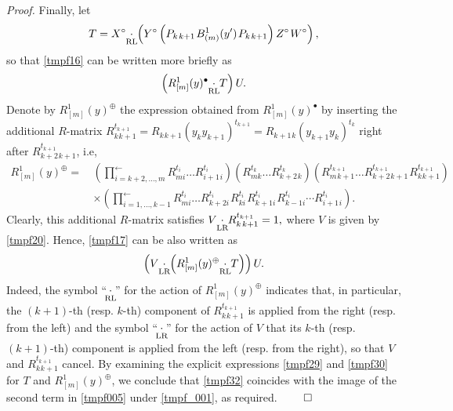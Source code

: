 \documentclass[12pt,a4paper,reqno]{amsart}
\theoremstyle{stil}
\theoremstyle{defi}
\theoremstyle{defi}
\theoremstyle{stil}
\theoremstyle{stil}
\theoremstyle{stil}
\theoremstyle{prim}
\newenvironment{prf}{\noindent \textit{Proof.}}{\null\hfill$\qed$\hskip
2mm\vskip 2mm}
\newcommand{\non}{\nonumber}
\newcommand{\beq}{\begin{equation}}
\newcommand{\eeq}{\end{equation}}
\newcommand{\ts}{\hspace{1pt}}
\newcommand{\cdotrl}{\mathop{\hspace{-2pt}\underset{\text{RL}}{\cdot}\hspace{-2pt}}}
\newcommand{\cdotlr}{\mathop{\hspace{-2pt}\underset{\text{LR}}{\cdot}\hspace{-2pt}}}
\begin{document}
\begin{prf}
Finally, let
\beq\label{tmpf29}
T=
X^\circ \cdotrl\left(
 Y^\circ   \left(P_{k\ts k+1}\ts
B_{(m)}^1(y^\prime)\ts
P_{k\ts k+1}\right)    Z^\circ  \ts W^\circ\right),
\eeq
so that \eqref{tmpf16} can be written more briefly as 
\beq\label{tmpf17}
	\left(R_{[m]}^1 (y)^\bullet \cdotrl 
T\right) U.
\eeq
Denote by $R_{[m]}^1 (y)^\oplus $ the expression obtained from $R_{[m]}^1 (y)^\bullet$ by inserting the additional $R$-matrix 
$R_{k \ts k+1}^{t_{k+1}}
=R_{k \ts k+1}(y_k y_{k+1})^{t_{k+1}}
=R_{k+1 \ts k }(y_{k+1} y_{k })^{t_{k }}
$
right after 
$R_{k+2\ts k+1}^{t_{k+1}}$, i.e, 
\begin{align}
R_{[m]}^1 (y)^\oplus=\,
&\left(\prod_{i=k+2,\ldots ,m }^{\longleftarrow}
 R_{m i}^{t_i}  \ldots 
 R_{i+1\ts i}^{t_i}\right)
\left(R_{m k}^{t_k}  \ldots 
 R_{k+2\ts k}^{t_k} \right)
\left(R_{m \ts k+1}^{t_{k+1}}  \ldots 
 R_{k+2\ts k+1}^{t_{k+1}} \ts R_{k \ts k+1}^{t_{k+1}}\right)\non
\\
&\times
\left(\prod_{i=1,\ldots ,k-1 }^{\longleftarrow}
 R_{m i}^{t_i}  \ldots R_{k+2 i}^{t_i} \ts 
R_{k  i}^{t_i} \ts R_{k+1 i}^{t_i} \ts
R_{k-1 i}^{t_i} \cdots
 R_{i+1\ts i}^{t_i}\right).\label{tmpf30}
\end{align}
Clearly, this additional $R$-matrix satisfies 
$
V\cdotlr R_{k \ts k+1}^{t_{k+1}}= 1,
$
where $V$ is given by \eqref{tmpf20}.
Hence, \eqref{tmpf17} can be also written as
\beq\label{tmpf32}
\left(V\cdotlr \left(R_{[m]}^1 (y)^\oplus \cdotrl 
T\right)\right) U .
\eeq
Indeed, the symbol ``$\cdotrl$'' for the action of $R_{[m]}^1 (y)^\oplus$ indicates that, in particular, the $(k+1)$-th (resp. $k$-th) component of $R_{k \ts k+1}^{t_{k+1}}$ is applied from the right (resp. from the left) and the symbol ``$\cdotlr$''
for the action of $V$ that its $k$-th (resp. $(k+1)$-th) component  is applied from the left (resp. from the right), so that $V$ and $R_{k \ts k+1}^{t_{k+1}}$   cancel.
By examining the explicit expressions \eqref{tmpf29} and \eqref{tmpf30} for $T$ and $R_{[m]}^1 (y)^\oplus$, we conclude that \eqref{tmpf32} coincides with the image of the second term in \eqref{tmpf005} under \eqref{tmpf_001}, as required.
\end{prf}
\end{document}
